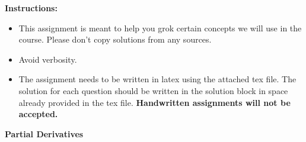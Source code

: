 \documentclass[solution,addpoints,12pt]{exam}
\begin{document}
\textbf{Instructions:}
\begin{itemize}
    \itemsep0em
    \item This assignment is meant to help you grok certain concepts we will use in the course. Please don't copy solutions from any sources.
    \item Avoid verbosity.
    \item The assignment needs to be written in latex using the attached tex file. The solution for each question should be written in the solution block in space already provided in the tex file. \textbf{Handwritten assignments will not be accepted.}
    
\end{itemize}

\begin{questions}

\question \textbf{Partial Derivatives}
          \newline
\end{questions}
\end{document}
